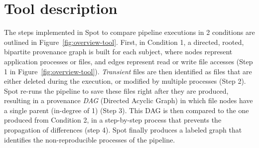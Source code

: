 \documentclass[a4paper,num-refs]{oup-contemporary}
\newcommand{\toolname}[0]{Spot\xspace}
\begin{document}



\section{Tool description}

The steps implemented in \toolname to compare pipeline executions in
2 conditions are outlined in Figure~\ref{fig:overview-tool}. First,
in Condition 1, a directed, rooted, bipartite provenance graph is built for
each subject, where nodes represent application processes or files, and
edges represent read or write file accesses (Step 1 in Figure~\ref{fig:overview-tool}). \emph{Transient} files are then identified as
 files that are either deleted during the execution, or modified by
multiple processes (Step 2). \toolname re-runs the pipeline to save these files
right after they are produced, resulting in a provenance \emph{DAG}
(Directed Acyclic Graph) in which file nodes have a single parent (in-degree
of 1) (Step 3). This DAG is then compared to the one produced from
Condition 2, in a step-by-step process that prevents the propagation of differences (step 4).
\toolname finally produces a labeled graph that identifies the
non-reproducible processes of the pipeline. 
\end{document}
